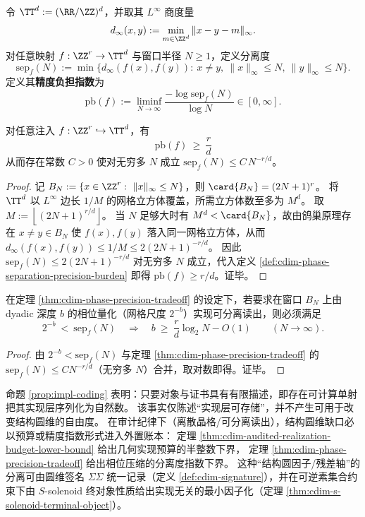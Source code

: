 \begin{definition}[分离度与精度负担指数]\label{def:cdim-phase-separation-precision-burden}
令 \(\TT^{d}:=(\RR/\ZZ)^{d}\)，并取其 \(L^\infty\) 商度量
\[
d_\infty(x,y):=\min_{m\in\ZZ^{d}}\|x-y-m\|_\infty.
\]
对任意映射 \(f:\ZZ^{r}\to \TT^{d}\) 与窗口半径 \(N\ge 1\)，定义分离度
\[
\mathrm{sep}_{f}(N)
:=\min\bigl\{d_\infty(f(x),f(y)):\ x\neq y,\ \|x\|_\infty\le N,\ \|y\|_\infty\le N\bigr\}.
\]
定义其\textbf{精度负担指数}为
\[
\mathrm{pb}(f):=\liminf_{N\to\infty}\frac{-\log \mathrm{sep}_{f}(N)}{\log N}\in[0,\infty].
\]
\end{definition}

\begin{theorem}[相位--精度权衡不等式]\label{thm:cdim-phase-precision-tradeoff}
对任意注入 \(f:\ZZ^{r}\hookrightarrow \TT^{d}\)，有
\[
\boxed{\;\mathrm{pb}(f)\ \ge\ \frac{r}{d}\;}
\]
从而存在常数 \(C>0\) 使对无穷多 \(N\) 成立
\(
\mathrm{sep}_{f}(N)\le C\,N^{-r/d}
\)。
\end{theorem}
\begin{proof}
记 \(B_N:=\{x\in\ZZ^{r}:\ \|x\|_\infty\le N\}\)，则 \(\card{B_N}=(2N+1)^{r}\)。
将 \(\TT^{d}\) 以 \(L^\infty\) 边长 \(1/M\) 的网格立方体覆盖，所需立方体数至多为 \(M^{d}\)。
取 \(M:=\left\lfloor(2N+1)^{r/d}\right\rfloor\)。
当 \(N\) 足够大时有 \(M^{d}<\card{B_N}\)，故由鸽巢原理存在 \(x\neq y\in B_N\) 使 \(f(x),f(y)\) 落入同一网格立方体，从而
\(
d_\infty(f(x),f(y))\le 1/M\le 2(2N+1)^{-r/d}
\)。
因此 \(\mathrm{sep}_{f}(N)\le 2(2N+1)^{-r/d}\) 对无穷多 \(N\) 成立，代入定义 \ref{def:cdim-phase-separation-precision-burden} 即得 \(\mathrm{pb}(f)\ge r/d\)。证毕。
\end{proof}

\begin{corollary}\label{cor:cdim-phase-precision-tradeoff-dyadic}
在定理 \ref{thm:cdim-phase-precision-tradeoff} 的设定下，若要求在窗口 \(B_N\) 上由 dyadic 深度 \(b\) 的相位量化（网格尺度 \(2^{-b}\)）实现可分离读出，则必须满足
\[
2^{-b}\ <\ \mathrm{sep}_{f}(N)
\quad\Longrightarrow\quad
b\ \ge\ \frac{r}{d}\log_2 N - O(1)
\qquad(N\to\infty).
\]
\end{corollary}
\begin{proof}
由 \(2^{-b}<\mathrm{sep}_{f}(N)\) 与定理 \ref{thm:cdim-phase-precision-tradeoff} 的 \(\mathrm{sep}_{f}(N)\le C N^{-r/d}\)（无穷多 \(N\)）合并，取对数即得。证毕。
\end{proof}

\begin{remark}[实现层单射与审计预算的区分]\label{rem:cdim-coding-vs-audit}
命题 \ref{prop:impl-coding} 表明：只要对象与证书具有有限描述，即存在可计算单射把其实现层序列化为自然数。
该事实仅陈述“实现层可存储”，并不产生可用于改变结构圆维的自由度。
在审计纪律下（离散晶格/可分离读出），结构圆维缺口必以预算或精度指数形式进入外置账本：
定理 \ref{thm:cdim-audited-realization-budget-lower-bound} 给出几何实现预算的半整数下界，
定理 \ref{thm:cdim-phase-precision-tradeoff} 给出相位压缩的分离度指数下界。
这种“结构圆因子/残差轴”的分离可由圆维签名 \(\Sigma\Sigma\) 统一记录（定义 \ref{def:cdim-signature}），并在可逆素集合约束下由 \(S\)-solenoid 终对象性质给出实现无关的最小因子化（定理 \ref{thm:cdim-s-solenoid-terminal-object}）。
\end{remark}



\endinput


